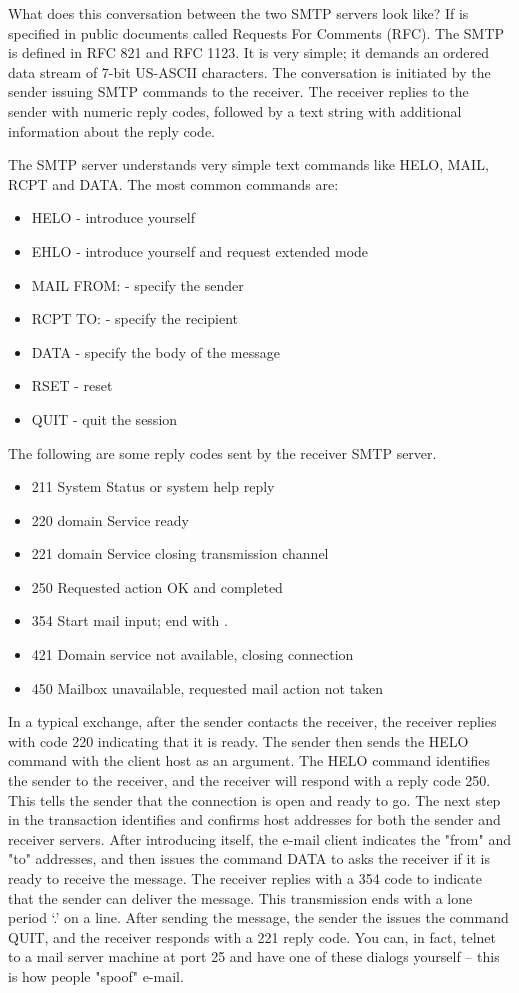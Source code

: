 \documentclass[12pt]{article}
\begin{document}
What does this conversation between the two SMTP servers look like?
If is specified in public documents
called Requests For Comments (RFC).
The SMTP is defined in RFC 821 and RFC 1123.
It is very simple; it demands an ordered data stream of 
7-bit US-ASCII characters.
The conversation is initiated by the sender issuing SMTP commands to
the receiver. 
The receiver replies to the sender with numeric reply codes, 
followed by a text string with additional information about the reply code.

The SMTP server understands very simple text commands like HELO, MAIL, 
RCPT and DATA. The most common commands are:

\begin{itemize}
\item HELO - introduce yourself
\item EHLO - introduce yourself and request extended mode
\item MAIL FROM: - specify the sender
\item RCPT TO: - specify the recipient
\item DATA - specify the body of the message 
\item RSET - reset
\item QUIT - quit the session
\end{itemize}

The following are some reply codes sent by the receiver SMTP server.

\begin{itemize}
\item 211  	System Status or system help reply
\item 220 	domain Service ready
\item 221 	domain Service closing transmission channel
\item 250 	Requested action OK and completed
\item 354 	Start mail input; end with .
\item 421 	Domain service not available, closing connection
\item 450 	Mailbox unavailable, requested mail action not taken
\end{itemize}

In a typical exchange, after the sender contacts the receiver,
the receiver replies with code 220 indicating that it is ready. 
The sender then sends the HELO command with the client host as an argument. 
The HELO command identifies the sender to the receiver, 
and the receiver will respond with a reply code 250. 
This tells the sender that the connection is open and ready to go. 
The next step in the transaction identifies and confirms host addresses 
for both the sender and receiver servers.
After introducing itself, the e-mail client 
indicates the "from" and "to" addresses, and then 
issues the command DATA to asks the receiver if it is ready to receive the 
message.
The receiver replies with a 354 code to indicate that the 
sender can deliver the message.
This transmission ends with a lone period `.' on a line. 
After sending the message, the sender the issues the command QUIT,
and the receiver responds with a 221 reply code.
You can, in fact, telnet to a mail server machine at port 25 and have 
one of these dialogs yourself -- this is how people "spoof" e-mail.
\end{document}
